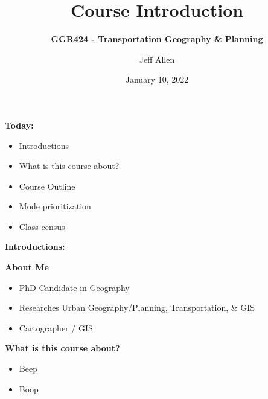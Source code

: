 \documentclass[aspectratio=169]{beamer}
\title{\textbf{Course Introduction}}
\subtitle{\textbf{GGR424 - Transportation Geography \& Planning}}
\author{Jeff Allen}
\institute{University of Toronto}
\date{January 10, 2022}
\begin{document}
	
\begin{frame}
	\titlepage	
\end{frame}



\begin{frame}
\textbf{Today:}
\begin{itemize}
	\item Introductions
	\item What is this course about?
	\item Course Outline
	\item Mode prioritization
	\item Class census
\end{itemize}
\end{frame}




\begin{frame}
\LARGE{\textbf{Introductions:}}
\end{frame}



\begin{frame}
\textbf{About Me}
\begin{itemize}
	\item PhD Candidate in Geography
	\item Researches Urban Geography/Planning, Transportation, \& GIS
	\item Cartographer / GIS
\end{itemize}
\end{frame}








\begin{frame}
	\textbf{What is this course about?}
	\begin{itemize}
		\item Beep
		\item Boop
	\end{itemize}
\end{frame}
\end{document}
